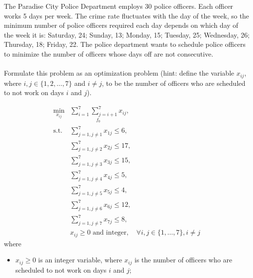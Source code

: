\begin{homeworkProblem}

    The Paradise City Police Department employs 30 police officers. Each officer 
    works 5 days per week. The crime rate fluctuates with the day of the week, 
    so the minimum number of police officers required each day depends on which 
    day of the week it is: Saturday, 24; Sunday, 13; Monday, 15; Tuesday, 25; 
    Wednesday, 26; Thursday, 18; Friday, 22. The police department wants to 
    schedule police officers to minimize the number of officers whose days off 
    are not consecutive.
    \\ \\
    Formulate this problem as an optimization problem (hint: define the variable 
    $x_{ij}$, where $i, j \in \{1, 2, \ldots, 7\}$ and $i\neq j$, to be the number 
    of officers who are scheduled to not work on days $i$ and $j$).
    \\

    \begin{solution}
        \[
            \begin{array}{rl}
                \min\limits_{x_{ij}} & \underset{f_0}{\boxed{\sum_{i=1}^{7} \sum_{j=i+1}^{7} x_{ij}}}, \\ [3ex]
                \text{s.t.} & \sum_{j=1, j \neq 1}^{7} x_{1j} \leq 6, \\ [2ex]
                            & \sum_{j=1, j \neq 2}^{7} x_{2j} \leq 17, \\ [2ex]
                            & \sum_{j=1, j \neq 3}^{7} x_{3j} \leq 15, \\ [2ex]
                            & \sum_{j=1, j \neq 4}^{7} x_{4j} \leq 5, \\ [2ex]
                            & \sum_{j=1, j \neq 5}^{7} x_{5j} \leq 4, \\ [2ex]
                            & \sum_{j=1, j \neq 6}^{7} x_{6j} \leq 12, \\ [2ex]
                            & \sum_{j=1, j \neq 7}^{7} x_{7j} \leq 8, \\ [3ex]
                            & x_{ij} \geq 0 \text{ and integer}, \quad \forall i,j \in \{1,\ldots,7\}, i \neq j
                        
            \end{array}
        \]
        where
        \begin{itemize}
            \item \(x_{ij} \geq 0\) is an integer variable, where \(x_{ij}\) is the number of officers who are scheduled to not work on days \(i\) and \(j\);
        \end{itemize}
    

    \end{solution}

\end{homeworkProblem}